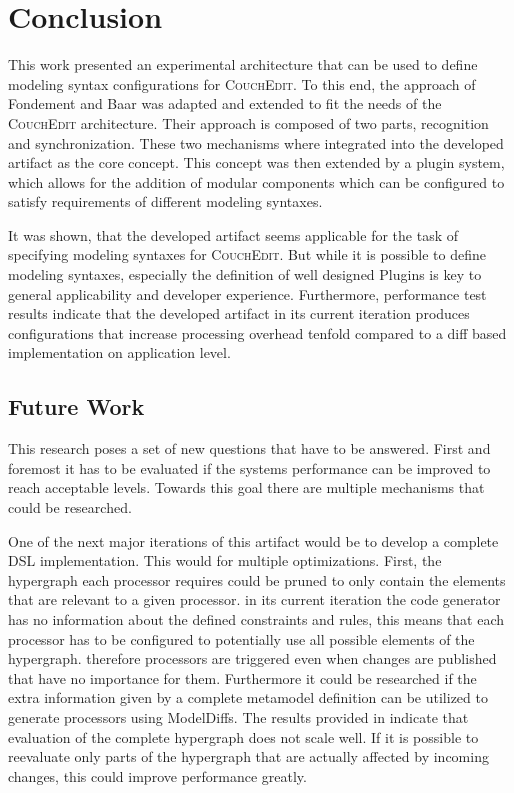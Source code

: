 \chapter{Conclusion}
\label{ch:conclusion}

This work presented an experimental architecture that can be used to define modeling syntax configurations for \textsc{CouchEdit}. To this end, the approach of Fondement and Baar \cite{fondement_making_2005} was adapted and extended to fit the needs of the \textsc{CouchEdit} architecture. Their approach is composed of two parts, recognition and synchronization. These two mechanisms where integrated into the developed artifact as the core concept. This concept was then extended by a plugin system, which allows for the addition of modular components which can be configured to satisfy requirements of different modeling syntaxes.

It was shown, that the developed artifact seems applicable for the task of specifying modeling syntaxes for \textsc{CouchEdit}. But while it is possible to define modeling syntaxes, especially the definition of well designed Plugins is key to general applicability and developer experience. Furthermore, performance test results indicate that the developed artifact in its current iteration produces configurations that increase processing overhead tenfold compared to a diff based implementation on application level.  

\section{Future Work}
This research poses a set of new questions that have to be answered. First and foremost it has to be evaluated if the systems performance can be improved to reach acceptable levels. Towards this goal there are multiple mechanisms that could be researched. 

One of the next major iterations of this artifact would be to develop a complete DSL implementation. This would for multiple optimizations. First, the hypergraph each processor requires could be pruned to only contain the elements that are relevant to a given processor. in its current iteration the code generator has no information about the defined constraints and rules, this means that each processor has to be configured to potentially use all possible elements of the hypergraph. therefore processors are triggered even when changes are published that have no importance for them. Furthermore it could be researched if the extra information given by a complete metamodel definition can be utilized to generate processors using ModelDiffs. The results provided in  indicate that evaluation of the complete hypergraph does not scale well. If it is possible to reevaluate only parts of the hypergraph that are actually affected by incoming changes, this could improve performance greatly.

